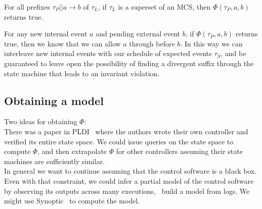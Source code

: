 For all prefixes $\tau_P || a\rightarrow b$ of $\tau_L$, if $\tau_L$ is a
superset of an MCS, then $\Phi(\tau_P, a, b)$ returns true.

For any new internal event $a$ and pending external event $b$, if
$\Phi(\tau_P, a, b)$ returns true, then we know that we can allow $a$ through
before $b$. In this way we can interleave new
internal events with our schedule of expected events $\tau_S$, and be
guaranteed to leave open the possibility of finding a divergent suffix through the
state machine that leads to an invariant violation.

\subsection{Obtaining a model}

Two ideas for obtaining $\Phi$: \\

 There was a paper in
PLDI~\cite{vericon} where the authors
wrote their own controller and verified its entire state space. We could issue
queries on the state space to compute $\Phi$, and then extrapolate $\Phi$ for
other controllers assuming their state machines are sufficiently similar. \\

 In general we want to
continue assuming that the control software is a black box.
Even with that constraint, we could infer a partial model of the control
software by observing its outputs across many executions, \ie~build a model
from logs. We might use Synoptic~\cite{beschastnikh2011leveraging} to compute
the model.
